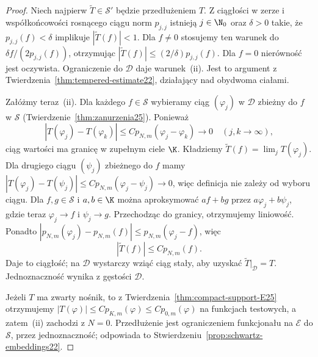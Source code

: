 \begin{proof}
Niech najpierw $\widetilde T\in\mathcal S'$ będzie
przedłużeniem $T$. Z ciągłości w zerze i współkońcowości
rosnącego ciągu norm $p_{j,j}$ istnieją $j\in\N_0$ oraz
$\delta>0$ takie, że $p_{j,j}(f)<\delta$ implikuje
$|\widetilde T(f)|<1$. Dla $f\ne0$ stosujemy ten warunek
do $\delta f/(2p_{j,j}(f))$, otrzymując
$|\widetilde T(f)|\le (2/\delta)p_{j,j}(f)$.
Dla $f=0$ nierówność jest oczywista. Ograniczenie
do $\mathcal D$ daje warunek~\textup{(ii)}.
Jest to argument z Twierdzenia~\ref{thm:tempered-estimate22},
działający nad obydwoma ciałami.

Załóżmy teraz~\textup{(ii)}. Dla każdego $f\in\mathcal S$
wybieramy ciąg $(\varphi_j)$ w $\mathcal D$ zbieżny do $f$
w $\mathcal S$ (Twierdzenie~\ref{thm:zanurzenia25}).
Ponieważ
\[
 |T(\varphi_j)-T(\varphi_k)|
 \le C p_{N,m}(\varphi_j-\varphi_k)\longrightarrow0
 \quad(j,k\to\infty),
\]
ciąg wartości ma granicę w zupełnym ciele $\K$.
Kładziemy $\widetilde T(f)=\lim_jT(\varphi_j)$.
Dla drugiego ciągu $(\psi_j)$ zbieżnego do $f$ mamy
$|T(\varphi_j)-T(\psi_j)|\le
C p_{N,m}(\varphi_j-\psi_j)\to0$, więc definicja nie zależy
od wyboru ciągu. Dla $f,g\in\mathcal S$ i $a,b\in\K$
można aproksymować $af+bg$ przez $a\varphi_j+b\psi_j$,
gdzie teraz $\varphi_j\to f$ i $\psi_j\to g$.
Przechodząc do granicy, otrzymujemy liniowość.
Ponadto $|p_{N,m}(\varphi_j)-p_{N,m}(f)|
\le p_{N,m}(\varphi_j-f)$, więc
\[
 |\widetilde T(f)|\le C p_{N,m}(f).
\]
Daje to ciągłość; na $\mathcal D$ wystarczy wziąć
ciąg stały, aby uzyskać $\widetilde T|_{\mathcal D}=T$.
Jednoznaczność wynika z gęstości $\mathcal D$.

Jeżeli $T$ ma zwarty nośnik, to z
Twierdzenia~\ref{thm:compact-support-E25} otrzymujemy
$|T(\varphi)|\le C p_{K,m}(\varphi)\le C p_{0,m}(\varphi)$
na funkcjach testowych, a zatem~\textup{(ii)} zachodzi z $N=0$.
Przedłużenie jest ograniczeniem funkcjonału na $\mathcal E$
do $\mathcal S$, przez jednoznaczność; odpowiada to
Stwierdzeniu~\ref{prop:schwartz-embeddings22}.
\end{proof}


